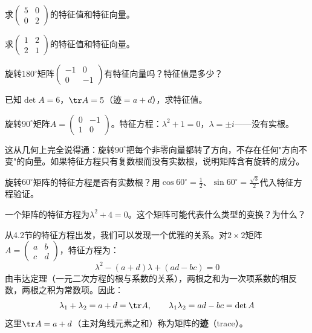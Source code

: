 \begin{exercise}
\item 求$\begin{pmatrix}5&0\\0&2\end{pmatrix}$的特征值和特征向量。
\item 求$\begin{pmatrix}1&2\\2&1\end{pmatrix}$的特征值和特征向量。
\item 旋转$180^\circ$矩阵$\begin{pmatrix}-1&0\\0&-1\end{pmatrix}$有特征向量吗？特征值是多少？
\item 已知$\det A=6$，$\tr A=5$（迹$=a+d$），求特征值。
\end{exercise}


旋转$90^\circ$矩阵$A=\begin{pmatrix}0&-1\\1&0\end{pmatrix}$。特征方程：$\lambda^2+1=0$，$\lambda=\pm i$——没有实根。

这从几何上完全说得通：旋转$90^\circ$把每个非零向量都转了方向，不存在任何"方向不变"的向量。如果特征方程只有复数根而没有实数根，说明矩阵含有旋转的成分。

\begin{exercise}
\item 旋转$60^\circ$矩阵的特征方程是否有实数根？用$\cos60^\circ=\frac12$、$\sin60^\circ=\frac{\sqrt3}{2}$代入特征方程验证。
\item 一个矩阵的特征方程为$\lambda^2+4=0$。这个矩阵可能代表什么类型的变换？为什么？
\end{exercise}


从4.2节的特征方程出发，我们可以发现一个优雅的关系。对$2\times2$矩阵$A=\begin{pmatrix}a&b\\c&d\end{pmatrix}$，特征方程为：
\[
\lambda^2-(a+d)\lambda+(ad-bc)=0
\]
由韦达定理（一元二次方程的根与系数的关系），两根之和为一次项系数的相反数，两根之积为常数项。因此：
\[
\lambda_1+\lambda_2 = a+d = \tr A,\qquad
\lambda_1\lambda_2 = ad-bc = \det A
\]
这里$\tr A = a+d$（主对角线元素之和）称为矩阵的\textbf{迹}（trace）。

